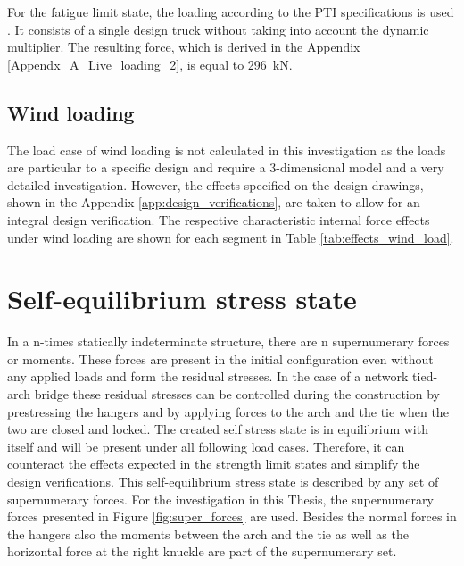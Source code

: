 

For the fatigue limit state, the loading according to the PTI specifications is used \cite{PTI}. It consists of a single design truck without taking into account the dynamic multiplier. The resulting force, which is derived in the Appendix \ref{Appendx_A_Live_loading_2}, is equal to \SI{296}{kN}.



\subsection{Wind loading}
The load case of wind loading is not calculated in this investigation as the loads are particular to a specific design and require a 3-dimensional model and a very detailed investigation. However, the effects specified on the design drawings, shown in the Appendix \ref{app:design_verifications}, are taken to allow for an integral design verification. The respective characteristic internal force effects under wind loading are shown for each segment in Table \ref{tab:effects_wind_load}.




\newpage
\section{Self-equilibrium stress state} \label{sec:met_seq}
In a n-times statically indeterminate structure, there are n supernumerary forces or moments. These forces are present in the initial configuration even without any applied loads and form the residual stresses. In the case of a network tied-arch bridge these residual stresses can be controlled during the construction by prestressing the hangers and by applying forces to the arch and the tie when the two are closed and locked. The created self stress state is in equilibrium with itself and will be present under all following load cases. Therefore, it can counteract the effects expected in the strength limit states and simplify the design verifications. This self-equilibrium stress state is described by any set of supernumerary forces. For the investigation in this Thesis, the supernumerary forces presented in Figure \ref{fig:super_forces} are used. Besides the normal forces in the hangers also the moments between the arch and the tie as well as the horizontal force at the right knuckle are part of the supernumerary set.

